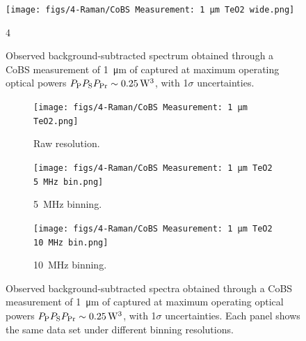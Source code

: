 \begin{figure}[t]
  \centering
  \hspace{-2em}\texttt{[image: figs/4-Raman/CoBS Measurement: 1 μm TeO2 wide.png]}
  \caption{Observed background-subtracted spectrum obtained through a \ac{CoBS} measurement of \SI{1}{\micro\meter} of  captured at maximum operating optical powers \(P_{\rm P}P_{\rm S}P_{\rm Pr} \sim \SI{0.25}{\cubic\watt}\), with 1\(\sigma\) uncertainties.}4
  \label{fig:Raman:1umTeO2}
\end{figure}

\begin{figure}[t]
  \centering
  \begin{subfigure}[b]{0.85\textwidth}
    \centering
    \hspace{-2em}\texttt{[image: figs/4-Raman/CoBS Measurement: 1 μm TeO2.png]}
    \caption{Raw resolution.}
    \label{fig:Raman:1umTeO2Raw}
  \end{subfigure}

  \vspace{1em}

  \begin{subfigure}[b]{0.49\textwidth}
    \centering
    \texttt{[image: figs/4-Raman/CoBS Measurement: 1 μm TeO2 5 MHz bin.png]}
    \caption{\SI{5}{\mega\hertz} binning.}
    \label{fig:Raman:1umTeO25MHzBin}
  \end{subfigure}
  \hfill
  \begin{subfigure}[b]{0.49\textwidth}
    \centering
    \texttt{[image: figs/4-Raman/CoBS Measurement: 1 μm TeO2 10 MHz bin.png]}
    \caption{\SI{10}{\mega\hertz} binning.}
    \label{fig:Raman:1umTeO10MHzBin}
  \end{subfigure}

  \caption{Observed background-subtracted spectra obtained through a \ac{CoBS} measurement of \SI{1}{\micro\meter} of  captured at maximum operating optical powers \(P_{\rm P}P_{\rm S}P_{\rm Pr} \sim \SI{0.25}{\cubic\watt}\), with 1\(\sigma\) uncertainties. Each panel shows the same data set under different binning resolutions.}
  \label{fig:Raman:1umTeO2_combined}
\end{figure}

